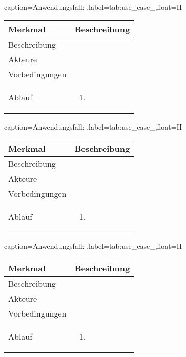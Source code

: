 \begin{dhbwtable}{caption={Anwendungsfall: },label=tab:use_case_,float=H}
    \begin{tabularx}{\textwidth}{lX}
        \toprule
        \textbf{Merkmal} & \textbf{Beschreibung}  \\ \midrule
        Beschreibung    &  \\
        Akteure         &  \\
        Vorbedingungen  &  \\
        Ablauf          & \begin{enumerate}
            \item 
        \end{enumerate} \\\bottomrule
    \end{tabularx}    
\end{dhbwtable}

\begin{dhbwtable}{caption={Anwendungsfall: },label=tab:use_case_,float=H}
    \begin{tabularx}{\textwidth}{lX}
        \toprule
        \textbf{Merkmal} & \textbf{Beschreibung}  \\ \midrule
        Beschreibung    &  \\
        Akteure         &  \\
        Vorbedingungen  &  \\
        Ablauf          & \begin{enumerate}
            \item 
        \end{enumerate} \\\bottomrule
    \end{tabularx}    
\end{dhbwtable}

\begin{dhbwtable}{caption={Anwendungsfall: },label=tab:use_case_,float=H}
    \begin{tabularx}{\textwidth}{lX}
        \toprule
        \textbf{Merkmal} & \textbf{Beschreibung}  \\ \midrule
        Beschreibung    &  \\
        Akteure         &  \\
        Vorbedingungen  &  \\
        Ablauf          & \begin{enumerate}
            \item 
        \end{enumerate} \\\bottomrule
    \end{tabularx}    
\end{dhbwtable}

